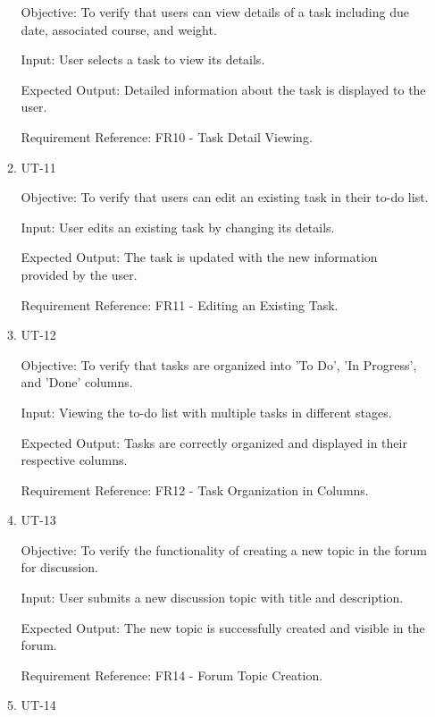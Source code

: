 \documentclass[12pt, titlepage]{article}
\begin{document}
\begin{enumerate}
\begin{enumerate}
        Objective: To verify that users can view details of a task including due date, associated course, and weight.
        
        Input: User selects a task to view its details.
        
        Expected Output: Detailed information about the task is displayed to the user.
        
        Requirement Reference: FR10 - Task Detail Viewing.
        
    \item{UT-11\\}\label{UT-11}
    
        Objective: To verify that users can edit an existing task in their to-do list.
        
        Input: User edits an existing task by changing its details.
        
        Expected Output: The task is updated with the new information provided by the user.
        
        Requirement Reference: FR11 - Editing an Existing Task.
        
    \item{UT-12\\}\label{UT-12}
    
        Objective: To verify that tasks are organized into 'To Do', 'In Progress', and 'Done' columns.
        
        Input: Viewing the to-do list with multiple tasks in different stages.
        
        Expected Output: Tasks are correctly organized and displayed in their respective columns.
        
        Requirement Reference: FR12 - Task Organization in Columns.

    \item{UT-13\\}\label{UT-13}
    
        Objective: To verify the functionality of creating a new topic in the forum for discussion.
        
        Input: User submits a new discussion topic with title and description.
        
        Expected Output: The new topic is successfully created and visible in the forum.
        
        Requirement Reference: FR14 - Forum Topic Creation.
        
    \item{UT-14\\}\label{UT-14}
    

\end{enumerate}
\end{enumerate}
\end{document}
